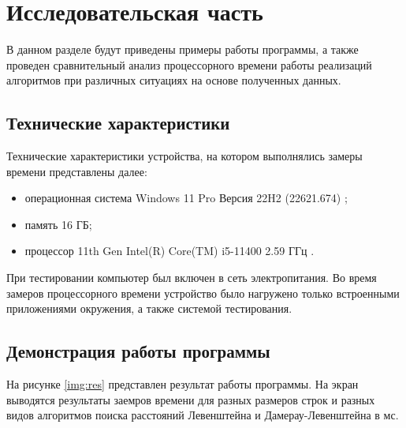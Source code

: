 \chapter{Исследовательская часть}

В данном разделе будут приведены примеры работы программы, а также проведен сравнительный анализ процессорного времени работы реализаций алгоритмов при различных ситуациях на основе полученных данных.

\section{Технические характеристики}

Технические характеристики устройства, на котором выполнялись замеры времени представлены далее:

\begin{itemize}
	\item операционная система Windows 11 Pro Версия 22H2 (22621.674) \cite{wind};
	\item память 16 ГБ;
	\item процессор 11th Gen Intel(R) Core(TM) i5-11400 2.59 ГГц \cite{proc}.
\end{itemize}

При тестировании компьютер был включен в сеть электропитания. Во время замеров процессорного времени устройство было нагружено только встроенными приложениями окружения, а также системой тестирования.

\section{Демонстрация работы программы}

На рисунке \ref{img:res} представлен результат работы программы. На экран выводятся результаты заемров времени для разных размеров строк и разных видов алгоритмов поиска расстояний Левенштейна и Дамерау-Левенштейна в мс.
\newpage
%
\begin{center}
	\label{img:res}
\end{center}

